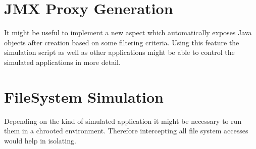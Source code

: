 \documentclass[a4paper,oneside]{book}
\begin{document}
\section{JMX Proxy Generation}
It might be useful to implement a new aspect which automatically exposes Java objects after creation based on some filtering criteria. Using this feature the simulation script as well as other applications might be able to control the simulated applications in more detail.

\section{FileSystem Simulation}
Depending on the kind of simulated application it might be necessary to run them in a chrooted environment. Therefore intercepting all file system accesses would help in isolating.



\end{document}
